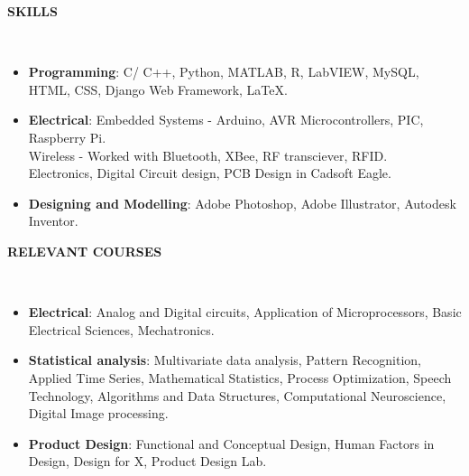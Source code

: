 \documentclass[a4paper,10pt]{article}
\newcommand{\lsep}{-0.5cm}
\newcommand{\resheading}[1]{{\small \colorbox{mygrey}{\begin{minipage}{0.975\textwidth}{\textbf{#1 \vphantom{p\^{E}}}}\end{minipage}}}}
\begin{document}
\resheading{\textbf{SKILLS} }\\[\lsep]
    \begin{itemize}
        \item \textbf{Programming}: C/ C++, Python, MATLAB, R, LabVIEW, MySQL, HTML, CSS, Django Web Framework, \LaTeX.
        \vspace{-5pt}
        \item \textbf{Electrical}: Embedded Systems - Arduino,  AVR Microcontrollers, PIC,  Raspberry Pi.\\
        Wireless - Worked with Bluetooth, XBee, RF transciever, RFID.\\
        Electronics, Digital Circuit design, PCB Design in Cadsoft Eagle.
        \vspace{-5pt}
        \item \textbf{Designing and Modelling}: Adobe Photoshop, Adobe Illustrator, Autodesk Inventor.
    \end{itemize}
    
\resheading{\textbf{RELEVANT COURSES} }\\[\lsep]
\begin{itemize}
    \item  \textbf{Electrical}: Analog and Digital circuits, Application of Microprocessors, Basic Electrical Sciences, Mechatronics.
    \vspace{-5pt}
    \item \textbf{Statistical analysis}: Multivariate data analysis, Pattern Recognition, Applied Time Series, Mathematical Statistics, Process Optimization, Speech Technology, Algorithms and Data Structures, Computational Neuroscience, Digital Image processing.

    \vspace{-5pt}
    \item \textbf{Product Design}: Functional and Conceptual Design, Human Factors in Design, Design for X, Product Design Lab.
\end{itemize}
\end{document}
